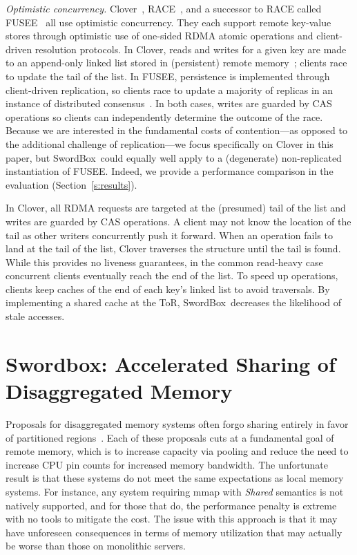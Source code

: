 \documentclass[12pt]{ucsddissertation}
\newcommand{\sword}{SwordBox}
\begin{document}
\emph{Optimistic concurrency.} Clover~\cite{clover}, RACE~\cite{race}, and a successor to RACE
called FUSEE~\cite{fusee} all use optimistic concurrency. They each support remote key-value stores
through optimistic use of one-sided RDMA atomic operations and client-driven resolution protocols.
In Clover, reads and writes for a given key are made to an append-only linked list stored in
(persistent) remote memory~\cite{clover}; clients race to update the tail of the list. In FUSEE,
persistence is implemented through client-driven replication, so clients race to update a majority
of replicas in an instance of distributed consensus~\cite{fusee}. In both cases, writes are guarded
by CAS operations so clients can independently determine the outcome of the race. Because we are
interested in the fundamental costs of contention—as opposed to the additional challenge of
replication—we focus specifically on Clover in this paper, but \sword\ could equally well apply to a
(degenerate) non-replicated instantiation of FUSEE. Indeed, we provide a performance comparison in
the evaluation (Section~\ref{s:results}).

In Clover, all RDMA requests are targeted at the (presumed) tail of the list and writes are guarded
by CAS operations. A client may not know the location of the tail as other writers concurrently push
it forward. When an operation fails to land at the tail of the list, Clover traverses the structure
until the tail is found. While this provides no liveness guarantees, in the common read-heavy case
concurrent clients eventually reach the end of the list. To speed up operations, clients keep caches
of the end of each key's linked list to avoid traversals. By implementing a shared cache at the ToR,
\sword\ decreases the likelihood of stale accesses.


\chapter{Swordbox: Accelerated Sharing of Disaggregated Memory}
\label{chap:swordbox}


Proposals for disaggregated memory systems often forgo sharing entirely in favor of partitioned
regions~\cite{infiniswap,fastswap,leap,legoos}. Each of these proposals cuts at a fundamental
goal of remote memory, which is to increase capacity via pooling and reduce the need to increase CPU
pin counts for increased memory bandwidth. The unfortunate result is that these systems do not meet
the same expectations as local memory systems. For instance, any system requiring mmap with
\textit{Shared} semantics is not natively supported, and for those that do, the performance penalty
is extreme with no tools to mitigate the cost. The issue with this approach is that it may have
unforeseen consequences in terms of memory utilization that may actually be worse than those on
monolithic servers. 
\end{document}
